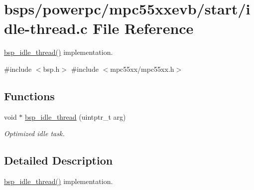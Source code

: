\hypertarget{idle-thread_8c}{}\section{bsps/powerpc/mpc55xxevb/start/idle-\/thread.c File Reference}
\label{idle-thread_8c}


\mbox{\hyperlink{group__RTEMSBSPsARMLPC176X_ga301be7085b80c41a9c5887247003c662}{bsp\+\_\+idle\+\_\+thread()}} implementation.  


{\ttfamily \#include $<$bsp.\+h$>$}\newline
{\ttfamily \#include $<$mpc55xx/mpc55xx.\+h$>$}\newline
\subsection*{Functions}
\begin{DoxyCompactItemize}
\item 
void $\ast$ \mbox{\hyperlink{group__RTEMSBSPsARMLPC176X_ga301be7085b80c41a9c5887247003c662}{bsp\+\_\+idle\+\_\+thread}} (uintptr\+\_\+t arg)
\begin{DoxyCompactList}\small\item\em Optimized idle task. \end{DoxyCompactList}\end{DoxyCompactItemize}


\subsection{Detailed Description}
\mbox{\hyperlink{group__RTEMSBSPsARMLPC176X_ga301be7085b80c41a9c5887247003c662}{bsp\+\_\+idle\+\_\+thread()}} implementation. 

